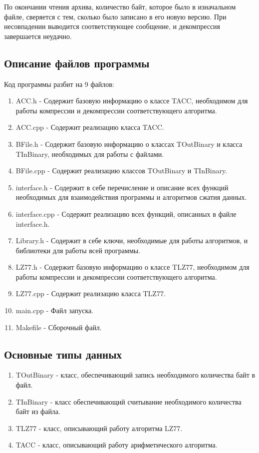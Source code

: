 \documentclass[12pt]{article}
\begin{document}
По окончании чтения архива, количество байт, которое было в изначальном файле, сверяется с тем, сколько было записано в его новую версию. При несовпадении выводится соответствующее сообщение, и декомпрессия завершается неудачно.

\subsection*{Описание файлов программы}

Код программы разбит на 9 файлов:

\begin{enumerate}
	\item ACC.h - Содержит базовую информацию о классе TACC, необходимом для работы компрессии и декомпрессии соответствующего алгоритма. 
	\item ACC.cpp - Содержит реализацию класса TACC.
	\item BFile.h - Содержит базовую информацию о классах TOutBinary и класса TInBinary, необходимых для работы с файлами.
	\item BFile.cpp - Содержит реализацию классов TOutBinary и TInBinary.
	\item interface.h - Содержит в себе перечисление и описание всех функций необходимых для взаимодействия программы и алгоритмов сжатия данных.
	\item interface.cpp - Содержит реализацию всех функций, описанных в файле interface.h.
	\item Library.h - Содержит в себе ключи, необходимые для работы алгоритмов, и библиотеки для работы всей программы.
	\item LZ77.h - Содержит базовую информацию о классе TLZ77, необходимом для работы компрессии и декомпрессии соответствующего алгоритма.
	\item LZ77.cpp - Содержит реализацию класса TLZ77.
	\item main.cpp - Файл запуска.
	\item Makefile - Сборочный файл.
\end{enumerate}

\subsection*{Основные типы данных}

\begin{enumerate}
	\item TOutBinary - класс, обеспечивающий запись необходимого количества байт в файл.
	\item TInBinary - класс обеспечивающий считывание необходимого количества байт из файла.
	\item TLZ77 - класс, описывающий работу алгоритма LZ77.
	\item TACC - класс, описывающий работу арифметического алгоритма.
\end{enumerate}
\end{document}
